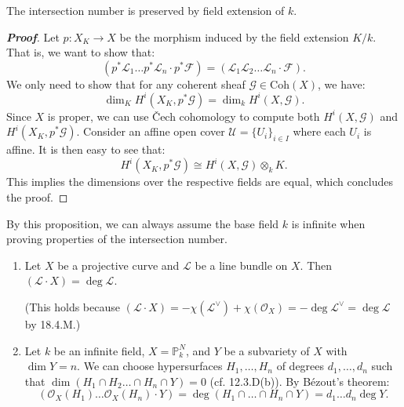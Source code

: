 \begin{proposition}[20.1.B]\label{20.1.B}
The intersection number is preserved by field extension of $k$.
\end{proposition}

\begin{proof}[\textbf{Proof}]
Let $p: X_K \to X$ be the morphism induced by the field extension $K/k$. That is, we want to show that:
\[
(p^*\mathcal{L}_1 \dots p^*\mathcal{L}_n \cdot p^*\mathcal{F}) = (\mathcal{L}_1 \mathcal{L}_2 \dots \mathcal{L}_n \cdot \mathcal{F}).
\]
We only need to show that for any coherent sheaf $\mathcal{G} \in \text{Coh}(X)$, we have:
\[
\dim_K H^i(X_K, p^*\mathcal{G}) = \dim_k H^i(X, \mathcal{G}).
\]
Since $X$ is proper, we can use \v{C}ech cohomology to compute both $H^i(X, \mathcal{G})$ and $H^i(X_K, p^*\mathcal{G})$. Consider an affine open cover $\mathcal{U} = \{U_i\}_{i \in I}$ where each $U_i$ is affine. It is then easy to see that:
\[
H^i(X_K, p^*\mathcal{G}) \cong H^i(X, \mathcal{G}) \otimes_k K.
\]
This implies the dimensions over the respective fields are equal, which concludes the proof.
\end{proof}

\begin{remark}
    By this proposition, we can always assume the base field $k$ is infinite when proving properties of the intersection number.
\end{remark}

\begin{proposition}[20.1.C]
\quad
\begin{enumerate}
    \item[(a)] Let $X$ be a projective curve and $\mathcal{L}$ be a line bundle on $X$. Then $(\mathcal{L} \cdot X) = \deg \mathcal{L}$.
    
    (This holds because $(\mathcal{L} \cdot X) = -\chi(\mathcal{L}^{\vee}) + \chi(\mathcal{O}_X) = - \deg \mathcal{L}^{\vee} = \deg \mathcal{L}$ by 18.4.M.)
    
    \item[(b)] Let $k$ be an infinite field, $X = \mathbb{P}^N_k$, and $Y$ be a subvariety of $X$ with $\dim Y = n$. We can choose hypersurfaces $H_1, \dots, H_n$ of degrees $d_1, \dots, d_n$ such that $\dim(H_1 \cap H_2 \dots \cap H_n \cap Y) = 0$ (cf. 12.3.D(b)). By B\'ezout's theorem:
    \[
    (\mathcal{O}_X(H_1)\ldots \mathcal{O}_X(H_n) \cdot Y) = \deg(H_1 \cap \dots \cap H_n \cap Y) = d_1 \dots d_n \deg Y.
    \]
\end{enumerate}
\end{proposition}

